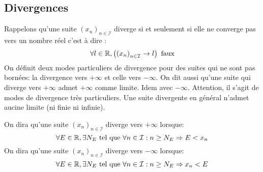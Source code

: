 \subsection{Divergences}
Rappelons qu'une suite $\left(x_n \right)_{n\in\mathcal I}$ diverge si et seulement si elle ne converge pas vers un nombre réel c'est à dire :
\[
 \forall l\in \mathbb{R}, \left( \left(x_n \right)_{n\in\mathcal I} \rightarrow l\right) \text{ faux} 
\]
On définit deux modes particuliers de divergence pour des suites qui ne sont pas bornées: la divergence vers $+\infty$ et celle vers $-\infty$. On dit aussi qu'une suite qui diverge vers $+\infty$ admet $+\infty$ comme limite. Idem avec $-\infty$. Attention, il s'agit de modes de divergence très particuliers. Une suite divergente en général n'admet aucine limite (ni finie ni infinie).
\begin{defi}
 On dira qu'une suite $\left(x_n \right)_{n\in\mathcal I}$ diverge vers $+\infty$ lorsque:
\begin{displaymath}
 \forall E\in \mathbb{R}, \exists N_E \text{ tel que } \forall n \in \mathcal I : n\geq N_E \Rightarrow E < x_n
\end{displaymath}
On dira qu'une suite $\left(x_n \right)_{n\in\mathcal I}$ diverge vers $-\infty$ lorsque:
\begin{displaymath}
 \forall E\in \mathbb{R}, \exists N_E \text{ tel que } \forall n \in \mathcal I : n\geq N_E \Rightarrow x_n <E
\end{displaymath}
\end{defi}

